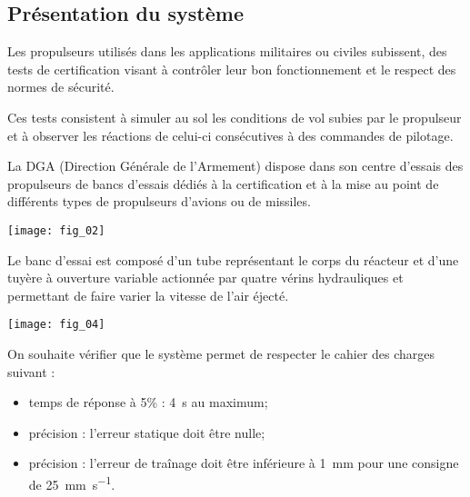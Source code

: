 \normaltrue \difficilefalse \tdifficilefalse
\correctionfalse




\setcounter{question}{0}%
\ifcorrection
\else
{}
\fi


\subsection*{Présentation du système}
\ifprof
\else
Les propulseurs utilisés dans les applications militaires ou civiles subissent, des tests de certification
visant à contrôler leur bon fonctionnement et le respect des normes de sécurité.

Ces tests consistent à simuler au sol les conditions de vol subies par le propulseur et à observer les réactions de celui-ci
consécutives à des commandes de pilotage. 

La DGA (Direction Générale de l'Armement) dispose dans son centre d'essais des propulseurs de bancs d'essais
dédiés à la certification et à la mise au point de différents types de propulseurs d'avions ou de missiles.

\begin{marginfigure}
\texttt{[image: fig\_02]}
\end{marginfigure}

Le banc d'essai est composé d'un tube représentant le corps du réacteur et d'une tuyère à ouverture variable
actionnée par quatre vérins hydrauliques et permettant de faire varier la vitesse de l'air éjecté. 


\begin{marginfigure}
\texttt{[image: fig\_04]}
\end{marginfigure}

\fi

\begin{obj}
On souhaite vérifier que le système permet de respecter le cahier des charges suivant : 
\begin{itemize}
\item temps de réponse à 5\% : \SI{4}{s} au maximum;
\item précision : l'erreur statique doit être nulle;
\item précision : l'erreur de traînage doit être inférieure à \SI{1}{mm} pour une consigne de \SI{25}{mm.s^{-1}}.
\end{itemize}
\end{obj}


